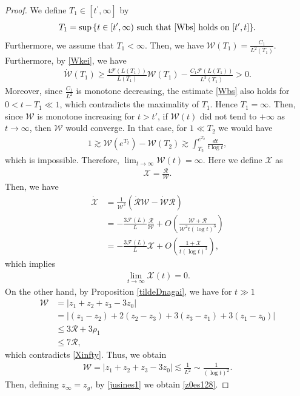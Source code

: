 \documentclass[reqno]{amsart}
\theoremstyle{plain}
\theoremstyle{definition}
\numberwithin{equation}{section}
\newcommand{\1}{\mathbbm{1}}
\begin{document}
\begin{proof}
We define $T_1\in [t^{\prime}, \infty]$ by
\begin{align}\label{bs1}
T_1=\sup{\{t\in[t^{\prime},\infty) \ \mbox{such that \eqref{Wbs} holds on}\ [t^{\prime},t]\}}.
\end{align}
Furthermore, we assume that $T_1<\infty$. Then, we have $\mathcal{W}(T_1)=\frac{C_1}{L^2(T_1)}$. Furthermore, by \eqref{Wkei}, we have
\begin{align*}
\dot{\mathcal{W}}(T_1)\geq \frac{4\mathcal{F}(L(T_1))}{L(T_1)}\mathcal{W}(T_1)-\frac{C_1\mathcal{F}(L(T_1))}{L^3(T_1)}>0.
\end{align*}
Moreover, since $\frac{C_1}{L^2}$ is monotone decreasing, the estimate \eqref{Wbs} also holds for $0<t-T_1\ll 1$, which contradicts the maximality of $T_1$.
Hence $T_1=\infty$. Then, since $\mathcal{W}$ is monotone increasing for $t>t'$, if $\mathcal{W}(t)$ did not tend to $+\infty$ as $t\to\infty$, then $\mathcal{W}$ would converge.
In that case, for $1\ll T_2$ we would have
\begin{align*}
1\gtrsim \mathcal{W}(e^{T_2})-\mathcal{W}(T_2)\gtrsim \int_{T_2}^{e^{T_2}}\frac{dt}{t\log t},
\end{align*}
which is impossible. Therefore, $\lim_{t\to\infty}\mathcal{W}(t)=\infty$. Here we define $\mathcal{X}$ as 
\begin{align}\label{Xdef}
\mathcal{X}=\frac{\mathcal{R}}{\mathcal{W}}.
\end{align}
Then, we have
\begin{align*}
\dot{\mathcal{X}}&=\frac{1}{\mathcal{W}^2}\left(\dot{\mathcal{R}}\mathcal{W}-\dot{\mathcal{W}}\mathcal{R} \right)
\\
&=-\frac{3\mathcal{F}(L)}{L}\frac{\mathcal{R}}{\mathcal{W}}+O\left(\frac{\mathcal{W}+\mathcal{R}}{\mathcal{W}^2t(\log{t})^3}\right)
\\
&=-\frac{3\mathcal{F}(L)}{L}\mathcal{X}+O\left(\frac{1+\mathcal{X}}{t(\log{t})^3}\right),
\end{align*}
which implies 
\begin{align}\label{Xinfty}
\lim_{t\to\infty}\mathcal{X}(t)=0.
\end{align}
On the other hand, by Proposition \ref{tildeDnagai}, we have for $t\gg 1$
\begin{align*}
\mathcal{W}&=|z_1+z_2+z_3-3z_0|
\\
&=\left|(z_1-z_2)+2(z_2-z_3)+3(z_3-z_1)+3(z_1-z_0)\right|
\\
&\leq 3\mathcal{R}+3\rho_1
\\
&\leq 7\mathcal{R},
\end{align*}
which contradicts \eqref{Xinfty}. Thus, we obtain
\begin{align*}
\mathcal{W}=|z_1+z_2+z_3-3z_0|\lesssim \frac{1}{L^2}\sim \frac{1}{(\log{t})^2}.
\end{align*}
Then, defining $z_{\infty}=z_g$, by \eqref{jusines1} we obtain \eqref{z0es128}.

\end{proof}
\end{document}
